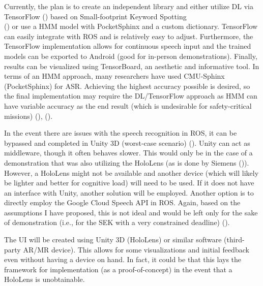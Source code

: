 Currently, the plan is to create an independent library and either utilize DL via TensorFlow (\cite{TensorFlow}) based on Small-footprint Keyword Spotting \\ (\cite{keyword}) or use a HMM model with PocketSphinx and a custom dictionary. TensorFlow can easily integrate with ROS and is relatively easy to adjust. Furthermore, the TensorFlow implementation allows for continuous speech input and the trained models can be exported to Android (good for in-person demonstrations). Finally, results can be visualized using TensorBoard, an aesthetic and informative tool. In terms of an HMM approach, many researchers have used CMU-Sphinx (PocketSphinx) for ASR. Achieving the highest accuracy possible is desired, so the final implementation may require the DL/TensorFlow approach as HMM can have variable accuracy as the end result (which is undesirable for safety-critical missions) (\cite{Amazigh}), (\cite{Covariance}). 
\smallskip

In the event there are issues with the speech recognition in ROS, it can be bypassed and completed in Unity 3D (worst-case scenario) (\cite{Unity}). Unity can act as middleware, though it often behaves slower. This would only be in the case of a demonstration that was also utilizing the HoloLens (as is done by Siemens (\cite{Siemens})). However, a HoloLens might not be available and another device (which will likely be lighter and better for cognitive load) will need to be used. If it does not have an interface with Unity, another solution will be employed. Another option is to directly employ the Google Cloud Speech API in ROS. Again, based on the assumptions I have proposed, this is not ideal and would be left only for the sake of demonstration (i.e., for the SEK with a very constrained deadline) (\cite{Google2}). 
\smallskip

The UI will be created using Unity 3D (HoloLens) or similar software (third-party AR/MR device). This allows for some visualizations and initial feedback even without having a device on hand. In fact, it could be that this lays the framework for implementation (as a proof-of-concept) in the event that a HoloLens is unobtainable.


